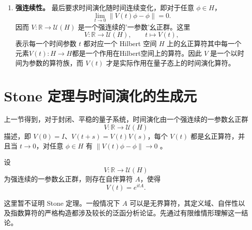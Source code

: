 \documentclass[UTF8,a4paper,11pt,openany]{ctexbook}
\begin{document}
\begin{enumerate}
    若 $V$ 对所有 $t\in\mathbb R$ 都有定义，则
    \begin{align}
        V(-t)V(t)
        &=V(0)=I,
        \nonumber\\
        V(t)V(-t)
        &=V(0)=I.
    \end{align}
    因而
    \begin{equation}
        V(-t)=V(t)^{-1}.
    \end{equation}

    这里才真正出现时间演化的可逆性：正向演化 $V(t)$ 之后再施加 $V(-t)$，可以恢复演化前的完整量子态。因此群结构表达了封闭平稳系统的时间演化不丢失量子信息。结合前面的内积保持性，此时
    \begin{equation}
        V(-t)=V(t)^{-1}=V(t)^\dagger,
    \end{equation}
    所以 $V(t)$ 是幺正算符。

    \item \textbf{强连续性。} 最后要求时间演化随时间连续变化，即对于任意 $\phi\in H$，
    \begin{equation}
        \lim_{t\to0}
        \|V(t)\phi-\phi\|
        =
        0.
    \end{equation}
    因而 $V:\mathbb R\to\mathcal U(H)$ 是一个强连续的'一参数'幺正群。这里
    \[
    V:\mathbb R\to\mathcal U(H),
    \qquad
    t\mapsto V(t),
    \]
    表示每一个时间参数 $t$ 都对应一个 Hilbert 空间 $H$ 上的幺正算符其中每一个元素$V(t):H\to H$都是一个作用在Hilbert空间上的算符。因此 $V$ 是一个以时间为参数的算符族，而 $V(t)$ 才是实际作用在量子态上的时间演化算符。
\end{enumerate}


\section{Stone 定理与时间演化的生成元}

上一节得到，对于封闭、平稳的量子系统，时间演化由一个强连续的一参数幺正群
\[
V:\mathbb R\to\mathcal U(H)
\]
描述，即 $V(0)=I$、$V(t+s)=V(t)V(s)$，每个 $V(t)$ 都是幺正算符，并且当 $t\to0$，对任意 $\phi\in H$ 有 $\|V(t)\phi-\phi\|\to0$ 。

\begin{proposition}
设
\[
V:\mathbb R\to\mathcal U(H)
\]
为强连续的一参数幺正群，则存在自伴算符 $A$，使得
\begin{equation}
    V(t)=e^{itA}.
\end{equation}
\end{proposition}

这里暂不证明 Stone 定理。一般情况下 $A$ 可以是无界算符，其定义域、自伴性以及指数算符的严格构造都涉及较长的泛函分析论证。先通过有限维情形理解这一结论。
\end{document}

